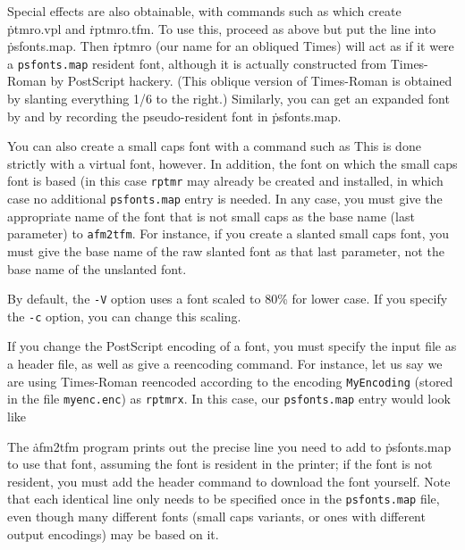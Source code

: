 
Special effects are also obtainable, with commands such as
\noindent
which create \.{ptmro.vpl} and \.{rptmro.tfm}.
To use this, proceed as above but put the line
\noindent
into \.{psfonts.map}.  Then \.{rptmro} (our name for an obliqued Times)
will act as if it were a
\^{{\tt psfonts.map}}
resident font, although it is actually constructed from Times-Roman
by PostScript hackery.   (This oblique version of Times-Roman is obtained
by slanting everything 1/6 to the right.)
Similarly, you can get an expanded font by
\noindent
and by recording the pseudo-resident font
\noindent
in \.{psfonts.map}.

You can also create a small caps font with a command such as
\noindent
This is done strictly with a virtual font, however.  In addition,
the font on which the small caps font is based (in this case
{\tt rptmr} may already be created and installed, in which case no
additional {\tt psfonts.map} entry is needed.
In any case, you must give the appropriate name of the font that
is not small caps as the base name (last parameter) to {\tt afm2tfm}.
For instance, if you create a slanted small caps font, you must
give the base name of the raw slanted font as that last parameter,
not the base name of the unslanted font.

By default, the {\tt -V} option uses a font scaled to 80\% for
lower case.  If you specify the {\tt -c} option, you can change
this scaling.

If you change the PostScript encoding of a font, you must specify the
input file as a header file, as well as give a reencoding
command.  For instance, let us say we are using Times-Roman
reencoded according to the encoding {\tt MyEncoding} (stored
in the file {\tt myenc.enc}) as {\tt rptmrx}.  In this case,
our {\tt psfonts.map} entry would look like

The \.{afm2tfm} program prints out the precise line you need to
add to \.{psfonts.map} to use that font, assuming the font is
resident in the printer; if the font is not resident, you must
add the header command to download the font yourself.  Note that
each identical line only needs to be specified once in the
{\tt psfonts.map} file, even though many different fonts (small
caps variants, or ones with different output encodings) may be
based on it.

